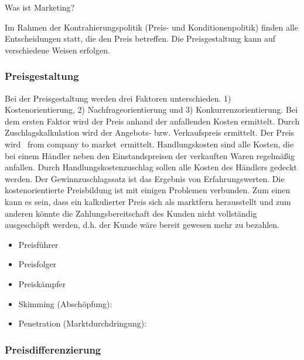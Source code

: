 Was ist Marketing?

Im Rahmen der Kontrahierungspolitik (Preis- und Konditionenpolitik) finden alle Entscheidungen statt, die den Preis betreffen. Die Preisgestaltung kann auf verschiedene Weisen erfolgen.

\subsubsection{Preisgestaltung}

Bei der Preisgestaltung werden drei Faktoren unterschieden. 1) Kostenorientierung, 2) Nachfrageorientierung und 3) Konkurrenzorientierung. Bei dem ersten Faktor wird der Preis anhand der anfallenden Kosten ermittelt. Durch Zuschlagskalkulation wird der Angebots- bzw. Verkaufspreis ermittelt. Der Preis wird \qr\ from company to market\qr\ ermittelt. Handlungskosten sind alle Kosten, die bei einem Händler neben den Einstandspreisen der verkauften Waren regelmäßig anfallen. Durch Handlungskostenzuschlag sollen alle Kosten des Händlers gedeckt werden. Der Gewinnzuschlagssatz ist das Ergebnis von Erfahrungswerten. Die kostenorientierte Preisbildung ist mit einigen Problemen verbunden. Zum einen kann es sein, dass ein kalkulierter Preis sich als marktfern herausstellt und zum anderen könnte die Zahlungsbereitschaft des Kunden nicht vollständig ausgeschöpft werden, d.h. der Kunde wäre bereit gewesen mehr zu bezahlen.

\begin{itemize}
	\item Preisführer
	\item Preisfolger
	\item Preiskämpfer
\end{itemize}



\begin{itemize}
	\item Skimming (Abschöpfung):
	\item Penetration (Marktdurchdringung):
\end{itemize}

\subsubsection{Preisdifferenzierung}

